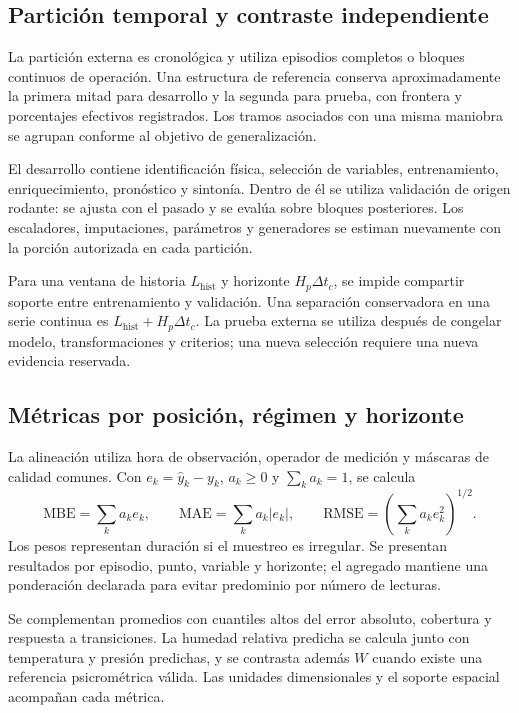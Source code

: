 \subsection{Partición temporal y contraste independiente}
\label{met:particion}

La partición externa es cronológica y utiliza episodios completos o bloques continuos de operación. Una estructura de referencia conserva aproximadamente la primera mitad para desarrollo y la segunda para prueba, con frontera y porcentajes efectivos registrados. Los tramos asociados con una misma maniobra se agrupan conforme al objetivo de generalización.

El desarrollo contiene identificación física, selección de variables, entrenamiento, enriquecimiento, pronóstico y sintonía. Dentro de él se utiliza validación de origen rodante: se ajusta con el pasado y se evalúa sobre bloques posteriores. Los escaladores, imputaciones, parámetros y generadores se estiman nuevamente con la porción autorizada en cada partición.

Para una ventana de historia $L_{\mathrm{hist}}$ y horizonte $H_p\Delta t_c$, se impide compartir soporte entre entrenamiento y validación. Una separación conservadora en una serie continua es $L_{\mathrm{hist}}+H_p\Delta t_c$. La prueba externa se utiliza después de congelar modelo, transformaciones y criterios; una nueva selección requiere una nueva evidencia reservada.

\subsection{Métricas por posición, régimen y horizonte}
\label{met:metricas}

La alineación utiliza hora de observación, operador de medición y máscaras de calidad comunes. Con $e_k=\widehat y_k-y_k$, $a_k\geq0$ y $\sum_k a_k=1$, se calcula
\begin{equation}
\mathrm{MBE}=\sum_ka_ke_k,\qquad
\mathrm{MAE}=\sum_ka_k|e_k|,\qquad
\mathrm{RMSE}=\left(\sum_ka_ke_k^2\right)^{1/2}.
\label{met:errores}
\end{equation}
Los pesos representan duración si el muestreo es irregular. Se presentan resultados por episodio, punto, variable y horizonte; el agregado mantiene una ponderación declarada para evitar predominio por número de lecturas.

Se complementan promedios con cuantiles altos del error absoluto, cobertura y respuesta a transiciones. La humedad relativa predicha se calcula junto con temperatura y presión predichas, y se contrasta además $W$ cuando existe una referencia psicrométrica válida. Las unidades dimensionales y el soporte espacial acompañan cada métrica.

